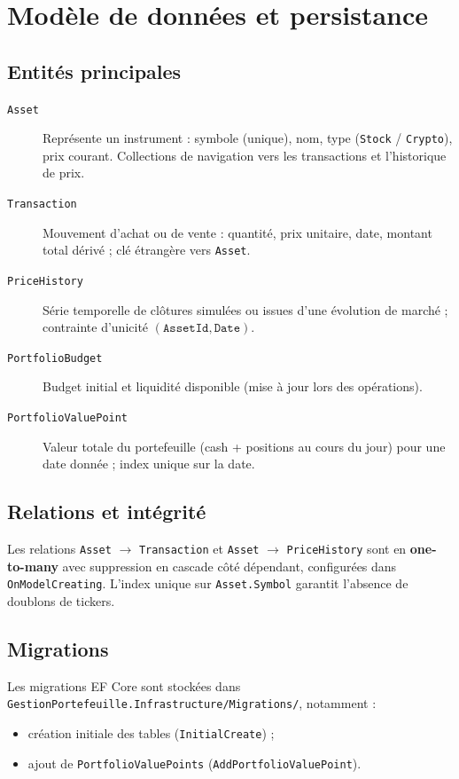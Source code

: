\chapter{Modèle de données et persistance}
\label{ch:donnees}

\section{Entités principales}

\begin{description}
  \item[\texttt{Asset}] Représente un instrument : symbole (unique), nom, type (\texttt{Stock} / \texttt{Crypto}), prix courant. Collections de navigation vers les transactions et l'historique de prix.
  \item[\texttt{Transaction}] Mouvement d'achat ou de vente : quantité, prix unitaire, date, montant total dérivé ; clé étrangère vers \texttt{Asset}.
  \item[\texttt{PriceHistory}] Série temporelle de clôtures simulées ou issues d'une évolution de marché ; contrainte d'unicité \((\texttt{AssetId}, \texttt{Date})\).
  \item[\texttt{PortfolioBudget}] Budget initial et liquidité disponible (mise à jour lors des opérations).
  \item[\texttt{PortfolioValuePoint}] Valeur totale du portefeuille (cash + positions au cours du jour) pour une date donnée ; index unique sur la date.
\end{description}

\section{Relations et intégrité}

Les relations \texttt{Asset} $\rightarrow$ \texttt{Transaction} et \texttt{Asset} $\rightarrow$ \texttt{PriceHistory} sont en \textbf{one-to-many} avec suppression en cascade côté dépendant, configurées dans \texttt{OnModelCreating}. L'index unique sur \texttt{Asset.Symbol} garantit l'absence de doublons de tickers.

\section{Migrations}

Les migrations EF Core sont stockées dans \texttt{GestionPortefeuille.Infrastructure/Migrations/}, notamment :
\begin{itemize}[leftmargin=*]
  \item création initiale des tables (\texttt{InitialCreate}) ;
  \item ajout de \texttt{PortfolioValuePoints} (\texttt{AddPortfolioValuePoint}).
\end{itemize}

